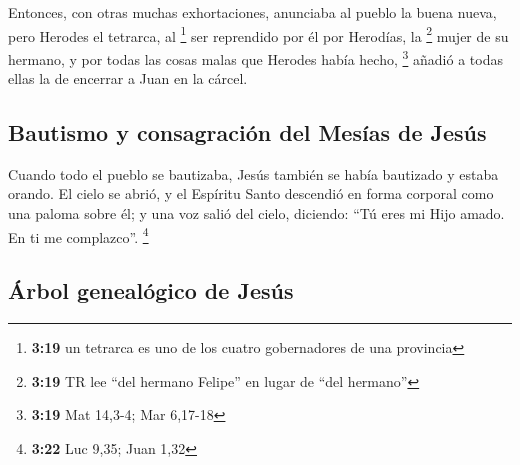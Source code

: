  Entonces, con otras muchas exhortaciones, anunciaba al
pueblo la buena nueva,  pero Herodes el tetrarca, al
\footnote{\textbf{3:19} un tetrarca es uno de los cuatro gobernadores de
  una provincia} ser reprendido por él por Herodías, la \footnote{\textbf{3:19}
  TR lee ``del hermano Felipe'' en lugar de ``del hermano''} mujer de su
hermano, y por todas las cosas malas que Herodes había hecho,
\footnote{\textbf{3:19} Mat 14,3-4; Mar 6,17-18}  añadió
a todas ellas la de encerrar a Juan en la cárcel.

\hypertarget{bautismo-y-consagraciuxf3n-del-mesuxedas-de-jesuxfas}{%
\subsection{Bautismo y consagración del Mesías de
Jesús}\label{bautismo-y-consagraciuxf3n-del-mesuxedas-de-jesuxfas}}

 Cuando todo el pueblo se bautizaba, Jesús también se
había bautizado y estaba orando. El cielo se abrió,  y el
Espíritu Santo descendió en forma corporal como una paloma sobre él; y
una voz salió del cielo, diciendo: ``Tú eres mi Hijo amado. En ti me
complazco''. \footnote{\textbf{3:22} Luc 9,35; Juan 1,32}

\hypertarget{uxe1rbol-genealuxf3gico-de-jesuxfas}{%
\subsection{Árbol genealógico de
Jesús}\label{uxe1rbol-genealuxf3gico-de-jesuxfas}}

